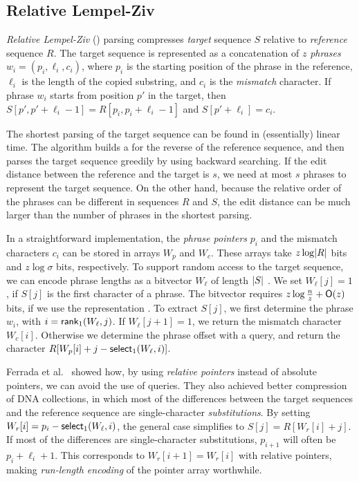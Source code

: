\subsection{Relative Lempel-Ziv}\label{sect:rlz}

\emph{Relative Lempel-Ziv} (\RLZ) parsing \cite{Kuruppu2010} compresses
\emph{target} sequence $S$ relative to \emph{reference} sequence $R$. The
target sequence is represented as a concatenation of $z$ \emph{phrases} $w_{i}
= (p_{i}, \ell_{i}, c_{i})$, where $p_{i}$ is the starting position of the
phrase in the reference, $\ell_{i}$ is the length of the copied substring, and
$c_{i}$ is the \emph{mismatch} character. If phrase $w_{i}$ starts from
position $p'$ in the target, then $S[p',p'+\ell_{i}-1] =
R[p_{i},p_{i}+\ell_{i}-1]$ and $S[p'+\ell_{i}] = c_{i}$.

The shortest \RLZ{} parsing of the target sequence can be found in
(essentially) linear time. The algorithm builds a \CSA{} for the reverse of
the reference sequence, and then parses the target sequence greedily by using
backward searching. If the edit distance between the reference and the target
is $s$, we need at most $s$ phrases to represent the target sequence. On the
other hand, because the relative order of the phrases can be different in
sequences $R$ and $S$, the edit distance can be much larger than the number of
phrases in the shortest \RLZ{} parsing.

In a straightforward implementation, the \emph{phrase pointers} $p_{i}$ and
the mismatch characters $c_{i}$ can be stored in arrays $W_{p}$ and
$W_{c}$. These arrays take $z \log \lvert R \rvert$ bits and $z \log \sigma$ bits,
respectively. To support random access to the target sequence, we can encode
phrase lengths as a bitvector $W_{\ell}$ of length $\lvert S \rvert$ \cite{Kuruppu2010}.
We set $W_{\ell}[j] = 1$, if $S[j]$ is the first character of a phrase. The
bitvector requires $z \log \frac{n}{z} + \mathsf{O}(z)$ bits, if we use the
\sdarray{} representation \cite{Okanohara2007}. To extract $S[j]$, we first
determine the phrase $w_{i}$, with $i = \mathsf{rank}_{1}(W_{\ell}, j)$. If
$W_{\ell}[j+1] = 1$, we return the mismatch character $W_{c}[i]$. Otherwise
we determine the phrase offset with a \select{} query, and return the character
$R[W_{p}[i] + j - \mathsf{select}_{1}(W_{\ell}, i)]$.

Ferrada et al.~\cite{Ferrada2014} showed how, by using \emph{relative pointers} instead of absolute pointers, we can avoid the use of \select{} queries. They also achieved better compression of DNA collections, in which most of the differences between the target sequences and the reference sequence are single-character \emph{substitutions}. By setting $W_{r}[i] = p_{i} - \mathsf{select}_{1}(W_{\ell}, i)$, the general case simplifies to $S[j] = R[W_{r}[i] + j]$.  If most of the differences are single-character substitutions, $p_{i+1}$ will often be $p_{i} + \ell_{i} + 1$. This corresponds to $W_{r}[i+1] = W_{r}[i]$ with relative pointers, making \emph{run-length encoding} of the pointer array worthwhile.

